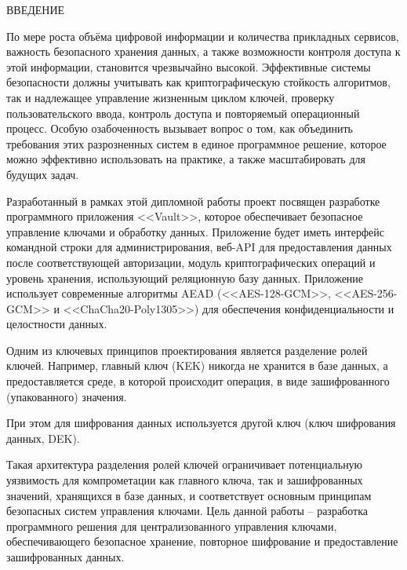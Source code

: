 \documentclass[14pt, a4paper]{extarticle}
\begin{document}
	\tableofcontents
	\newpage


	\begin{center}
		ВВЕДЕНИЕ
	\end{center}
	
	\vspace*{-0.2cm}
	
	По мере роста объёма цифровой информации и количества прикладных сервисов, важность безопасного хранения данных, а также возможности контроля доступа к этой информации, становится чрезвычайно высокой. Эффективные системы безопасности должны учитывать как криптографическую стойкость алгоритмов, так и надлежащее управление жизненным циклом ключей, проверку пользовательского ввода, контроль доступа и повторяемый операционный процесс. Особую озабоченность вызывает вопрос о том, как объединить требования этих разрозненных систем в единое программное решение, которое можно эффективно использовать на практике, а также масштабировать для будущих задач.
	
	Разработанный в рамках этой дипломной работы проект посвящен разработке программного приложения <<Vault>>, которое обеспечивает безопасное управление ключами и обработку данных. Приложение будет иметь интерфейс командной строки для администрирования, веб-API для предоставления данных после соответствующей авторизации, модуль криптографических операций и уровень хранения, использующий реляционную базу данных. Приложение использует современные алгоритмы AEAD (<<AES-128-GCM>>, <<AES-256-GCM>> и <<ChaCha20-Poly1305>>) для обеспечения конфиденциальности и целостности данных. 
	
	Одним из ключевых принципов проектирования является разделение ролей ключей. Например, главный ключ (KEK) никогда не хранится в базе данных, а предоставляется среде, в которой происходит операция, в виде зашифрованного (упакованного) значения. 
	
	При этом для шифрования данных используется другой ключ (ключ шифрования данных, DEK).
	
	Такая архитектура разделения ролей ключей ограничивает потенциальную уязвимость для компрометации как главного ключа, так и зашифрованных значений, хранящихся в базе данных, и соответствует основным принципам безопасных систем управления ключами. Цель данной работы -- разработка программного решения для централизованного управления ключами, обеспечивающего безопасное хранение, повторное шифрование и предоставление зашифрованных данных.
	
\end{document}
